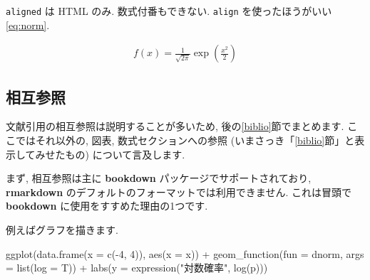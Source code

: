 \documentclass[
]{bxjsarticle}
\newenvironment{Shaded}{\begin{snugshade}}{\end{snugshade}}
\newcommand{\AttributeTok}[1]{\textcolor[rgb]{0.77,0.63,0.00}{#1}}
\newcommand{\DecValTok}[1]{\textcolor[rgb]{0.00,0.00,0.81}{#1}}
\newcommand{\FunctionTok}[1]{\textcolor[rgb]{0.00,0.00,0.00}{#1}}
\newcommand{\NormalTok}[1]{#1}
\newcommand{\SpecialCharTok}[1]{\textcolor[rgb]{0.00,0.00,0.00}{#1}}
\newcommand{\StringTok}[1]{\textcolor[rgb]{0.31,0.60,0.02}{#1}}
\begin{document}
\texttt{aligned} は HTML のみ. 数式付番もできない. \texttt{align} を使ったほうがいい\eqref{eq:norm}.

\begin{align}
f(x) = \frac1{\sqrt{2\pi}}\exp\left(\frac{x^2}{2}\right) \label{eq:norm}
\end{align}

\hypertarget{ux76f8ux4e92ux53c2ux7167}{%
\subsection{相互参照}\label{ux76f8ux4e92ux53c2ux7167}}

文献引用の相互参照は説明することが多いため, 後の\ref{biblio}節でまとめます. ここではそれ以外の, 図表, 数式セクションへの参照 (いまさっき「\ref{biblio}節」と表示してみせたもの) について言及します.

まず, 相互参照は主に \textbf{bookdown} パッケージでサポートされており, \textbf{rmarkdown} のデフォルトのフォーマットでは利用できません. これは冒頭で \textbf{bookdown} に使用をすすめた理由の1つです.

例えばグラフを描きます.

\begin{Shaded}
\begin{Highlighting}[numbers=left,,]
\FunctionTok{ggplot}\NormalTok{(}\FunctionTok{data.frame}\NormalTok{(}\AttributeTok{x =} \FunctionTok{c}\NormalTok{(}\SpecialCharTok{{-}}\DecValTok{4}\NormalTok{, }\DecValTok{4}\NormalTok{)), }\FunctionTok{aes}\NormalTok{(}\AttributeTok{x =}\NormalTok{ x)) }\SpecialCharTok{+}
  \FunctionTok{geom\_function}\NormalTok{(}\AttributeTok{fun =}\NormalTok{ dnorm, }\AttributeTok{args =} \FunctionTok{list}\NormalTok{(}\AttributeTok{log =}\NormalTok{ T)) }\SpecialCharTok{+}
  \FunctionTok{labs}\NormalTok{(}\AttributeTok{y =} \FunctionTok{expression}\NormalTok{(}\StringTok{"対数確率"}\NormalTok{, }\FunctionTok{log}\NormalTok{(p)))}
\end{Highlighting}
\end{Shaded}
\end{document}
